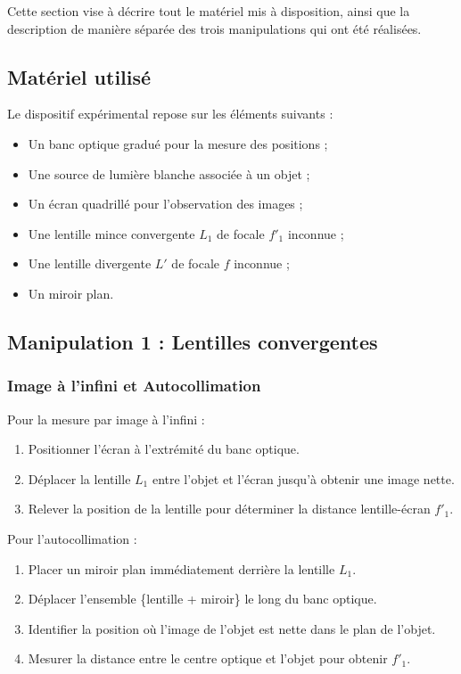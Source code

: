 Cette section vise à décrire tout le matériel mis à disposition, 
ainsi que la description de manière séparée 
des trois manipulations qui ont été réalisées.

\subsection{Matériel utilisé}
Le dispositif expérimental repose sur les éléments suivants :
\begin{itemize}
    \item Un banc optique gradué pour la mesure des positions ;
    \item Une source de lumière blanche associée à un objet ;
    \item Un écran quadrillé pour l'observation des images ;
    \item Une lentille mince convergente $L_1$ de focale $f'_1$ inconnue ;
    \item Une lentille divergente $L \prime$ de focale $f$ inconnue ; 
    \item Un miroir plan. 
\end{itemize}

\subsection{Manipulation 1 : Lentilles convergentes}

\subsubsection{Image à l'infini et Autocollimation}
Pour la mesure par image à l'infini :
\begin{enumerate}
    \item Positionner l'écran à l'extrémité du banc optique.
    \item Déplacer la lentille $L_1$ entre l'objet et l'écran jusqu'à obtenir une image nette.
    \item Relever la position de la lentille pour déterminer la distance lentille-écran $f'_1$.
\end{enumerate}

Pour l'autocollimation :
\begin{enumerate}
    \item Placer un miroir plan immédiatement derrière la lentille $L_1$.
    \item Déplacer l'ensemble \{lentille + miroir\} le long du banc optique.
    \item Identifier la position où l'image de l'objet est nette dans le plan de l'objet.
    \item Mesurer la distance entre le centre optique et l'objet pour obtenir $f'_1$.
\end{enumerate}

